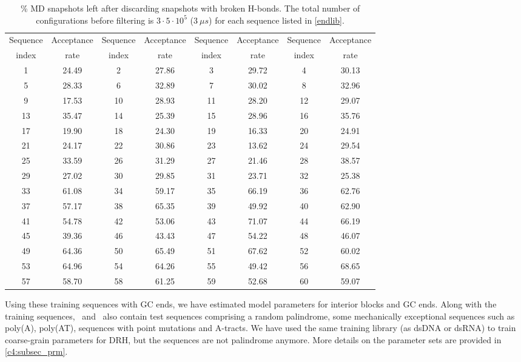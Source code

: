 \begin{table}[ht!]
\small
\centering
\begin{tabular}{c||c|c||c|c||c|c||c}
 Sequence   & Acceptance & Sequence   & Acceptance & Sequence   & Acceptance & Sequence   & Acceptance \\
  index  & rate & index & rate & index & rate & index & rate \\
\hline
  1  &  24.49  & 2  & 27.86 & 3  & 29.72 &  4  & 30.13 \\
  5  &  28.33  & 6  & 32.89 & 7  & 30.02 &  8  & 32.96 \\
  9  &  17.53  & 10 & 28.93 & 11 & 28.20 &  12 & 29.07 \\
  13 &  35.47  & 14 & 25.39 & 15 & 28.96 &  16 & 35.76 \\
  17 &  19.90  & 18 & 24.30 & 19 & 16.33 &  20 & 24.91 \\
  21 &  24.17  & 22 & 30.86 & 23 & 13.62 &  24 & 29.54 \\
  25 &  33.59  & 26 & 31.29 & 27 & 21.46 &  28 & 38.57 \\
  29 &  27.02  & 30 & 29.85 & 31 & 23.71 &  32 & 25.38 \\
  33 &  61.08  & 34 & 59.17 & 35 & 66.19 &  36 & 62.76 \\
  37 &  57.17  & 38 & 65.35 & 39 & 49.92 &  40 & 62.90 \\
  41 &  54.78  & 42 & 53.06 & 43 & 71.07 &  44 & 66.19 \\
  45 &  39.36  & 46 & 43.43 & 47 & 54.22 &  48 & 46.07 \\
  49 &  64.36  & 50 & 65.49 & 51 & 67.62 &  52 & 60.02 \\
  53 &  64.96  & 54 & 64.26 & 55 & 49.42 &  56 & 68.65 \\
  57 &  58.70  & 58 & 61.25 & 59 & 52.68 &  60 & 59.07 \\
\end{tabular}
\caption{\% MD snapshots left after discarding snapshots with broken H-bonds. 
The total number of configurations before filtering is $3\cdot5\cdot10^5$ ($3~\mu s$) for each sequence listed in \cref{endlib}.}
\label{c3:accept_tab_end}
\end{table} \clearpage

\noindent Using these training sequences with GC ends, we have estimated model parameters for interior blocks and GC ends.
Along with the training sequences, \Lbdna \ and \Lbrna \  also contain test sequences comprising a random palindrome, some mechanically exceptional sequences such as poly(A), poly(AT), sequences with point mutations and A-tracts. 
We have used the same training library (as dsDNA or dsRNA) to train coarse-grain parameters for DRH, but the sequences are not palindrome anymore.
More details on the parameter sets are provided in \cref{c4:subsec_prm}. 

